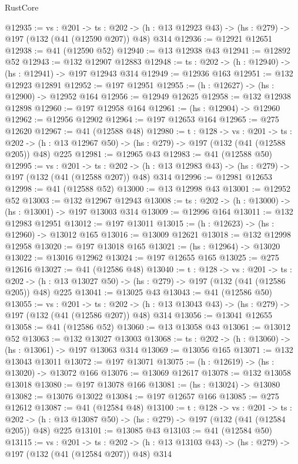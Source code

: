 \begin{lexlean}{RustCore}
\begin{coremodule}
@12935 := {vs : @201} ->
  {ts : @202} -> (h : @13 @12923 @43) -> (hs : @279) -> @197 (@132 (@41 (@12590 @207)) @48) @314
@12936 := @12921 @12651
@12938 := @41 (@12590 @52)
@12940 := @13 @12938 @43
@12941 := @12892 @52
@12943 := @132 @12907 @12883
@12948 := {ts : @202} -> (h : @12940) -> (hs : @12941) -> @197 @12943 @314
@12949 := @12936 @163
@12951 := @132 @12923 @12891
@12952 := @197 @12951
@12955 := (h : @12627) -> (hs : @12900) -> @12952 @164
@12956 := @12949 @12625
@12958 := @132 @12938 @12898
@12960 := @197 @12958 @164
@12961 := (hs : @12904) -> @12960
@12962 := @12956 @12902
@12964 := @197 @12653 @164
@12965 := @275 @12620
@12967 := @41 (@12588 @48)
@12980 := {t : @128} ->
  {vs : @201} ->
  {ts : @202} -> (h : @13 @12967 @50) -> (hs : @279) -> @197 (@132 (@41 (@12588 @205)) @48) @225
@12981 := @12965 @43
@12983 := @41 (@12588 @50)
@12995 := {vs : @201} ->
  {ts : @202} -> (h : @13 @12983 @43) -> (hs : @279) -> @197 (@132 (@41 (@12588 @207)) @48) @314
@12996 := @12981 @12653
@12998 := @41 (@12588 @52)
@13000 := @13 @12998 @43
@13001 := @12952 @52
@13003 := @132 @12967 @12943
@13008 := {ts : @202} -> (h : @13000) -> (hs : @13001) -> @197 @13003 @314
@13009 := @12996 @164
@13011 := @132 @12983 @12951
@13012 := @197 @13011
@13015 := (h : @12623) -> (hs : @12960) -> @13012 @165
@13016 := @13009 @12621
@13018 := @132 @12998 @12958
@13020 := @197 @13018 @165
@13021 := (hs : @12964) -> @13020
@13022 := @13016 @12962
@13024 := @197 @12655 @165
@13025 := @275 @12616
@13027 := @41 (@12586 @48)
@13040 := {t : @128} ->
  {vs : @201} ->
  {ts : @202} -> (h : @13 @13027 @50) -> (hs : @279) -> @197 (@132 (@41 (@12586 @205)) @48) @225
@13041 := @13025 @43
@13043 := @41 (@12586 @50)
@13055 := {vs : @201} ->
  {ts : @202} -> (h : @13 @13043 @43) -> (hs : @279) -> @197 (@132 (@41 (@12586 @207)) @48) @314
@13056 := @13041 @12655
@13058 := @41 (@12586 @52)
@13060 := @13 @13058 @43
@13061 := @13012 @52
@13063 := @132 @13027 @13003
@13068 := {ts : @202} -> (h : @13060) -> (hs : @13061) -> @197 @13063 @314
@13069 := @13056 @165
@13071 := @132 @13043 @13011
@13072 := @197 @13071
@13075 := (h : @12619) -> (hs : @13020) -> @13072 @166
@13076 := @13069 @12617
@13078 := @132 @13058 @13018
@13080 := @197 @13078 @166
@13081 := (hs : @13024) -> @13080
@13082 := @13076 @13022
@13084 := @197 @12657 @166
@13085 := @275 @12612
@13087 := @41 (@12584 @48)
@13100 := {t : @128} ->
  {vs : @201} ->
  {ts : @202} -> (h : @13 @13087 @50) -> (hs : @279) -> @197 (@132 (@41 (@12584 @205)) @48) @225
@13101 := @13085 @43
@13103 := @41 (@12584 @50)
@13115 := {vs : @201} ->
  {ts : @202} -> (h : @13 @13103 @43) -> (hs : @279) -> @197 (@132 (@41 (@12584 @207)) @48) @314

\end{coremodule}
\end{lexlean}
